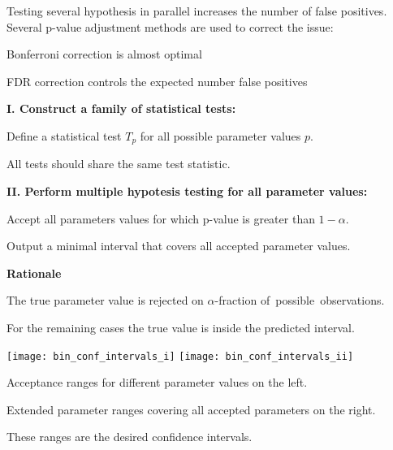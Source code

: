 \documentclass[landscape,footrule]{foils}
\begin{document}
Testing several hypothesis in parallel increases the number of false positives.  
Several p-value adjustment methods are used to correct the issue:
\begin{triangles}
\item Bonferroni correction is almost optimal 
\item FDR correction controls the expected number false positives  
\end{triangles}  
 

 
\textbf{I. Construct a family of statistical tests:}
\begin{triangles}
\item Define a statistical test $T_p$ for all possible parameter values $p$.
\item All tests should share the same test statistic.
\end{triangles}
\vspace*{1cm}

\textbf{II. Perform multiple hypotesis testing for all parameter values:}
\begin{triangles}
\item Accept all parameters values for which p-value is greater than $1-\alpha$.  
\item Output a minimal interval that covers all accepted parameter values.
\end{triangles}
\vspace*{1cm}

\textbf{Rationale}
\begin{triangles}
\item The true parameter value is rejected on $\alpha$-fraction of~possible~observations.
\item For the remaining cases the true value is inside the predicted interval. 
\end{triangles}


\enlargethispage{0.5cm}
\centerline{
\texttt{[image: bin\_conf\_intervals\_i]}
\texttt{[image: bin\_conf\_intervals\_ii]}}
\begin{triangles}
\item Acceptance ranges for different parameter values on the left.
\item Extended parameter ranges covering all accepted parameters on the right.
\item These ranges are the desired confidence intervals.
\end{triangles}
\end{document}
